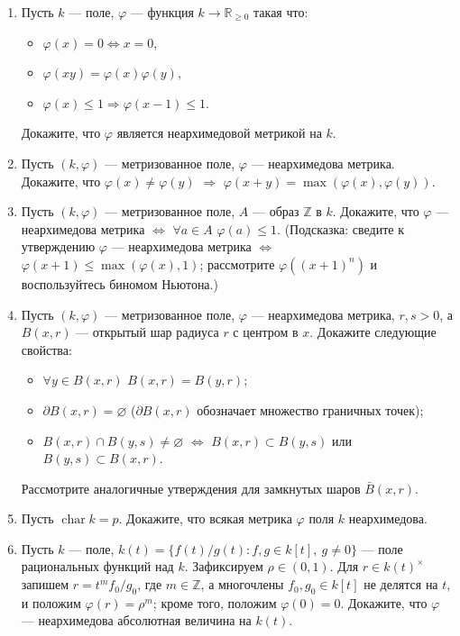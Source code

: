 \documentclass[a4paper, 11pt]{article}
\begin{document}
\begin{enumerate}[topsep=0pt]
    \item Пусть $k$ --- поле, $\varphi$ --- функция $k \rightarrow \mathbb{R}_{\geqslant 0}$ такая что:
    \begin{itemize}[topsep=0pt]
        \item $\varphi(x) = 0 \Leftrightarrow x=0$,
        \item $\varphi(xy) = \varphi(x)\varphi(y)$,
        \item $\varphi(x) \leqslant 1 \Rightarrow \varphi(x-1) \leqslant 1$.
    \end{itemize}
    Докажите, что $\varphi$ является неархимедовой метрикой на $k$.

    \item Пусть $(k,\varphi)$ --- метризованное поле, $\varphi$ --- неархимедова метрика. Докажите, что $\varphi(x) \neq \varphi(y)$ $\Rightarrow$ $\varphi(x+y) = \max(\varphi(x),\varphi(y))$.

    \item Пусть $(k,\varphi)$ --- метризованное поле, $A$ --- образ $\mathbb{Z}$ в $k$. Докажите, что $\varphi$ --- неархимедова метрика $\Leftrightarrow$ $\forall a \in A$ $\varphi(a) \leqslant 1$. (Подсказка: сведите к утверждению $\varphi$ --- неархимедова метрика $\Leftrightarrow$ $\varphi(x+1) \leqslant \max(\varphi(x),1)$; рассмотрите $\varphi((x+1)^n)$ и воспользуйтесь биномом Ньютона.)

    \item Пусть $(k,\varphi)$ --- метризованное поле, $\varphi$ --- неархимедова метрика, $r,s>0$, а $B(x,r)$ --- открытый шар радиуса $r$ с центром в $x$. Докажите следующие свойства:
    \begin{itemize}[topsep=0pt]
        \item $\forall y \in B(x,r)$ $B(x,r)=B(y,r)$;
        \item $\partial B(x,r) = \varnothing$ ($\partial B(x,r)$ обозначает множество граничных точек);
        \item $B(x,r) \cap B(y,s) \neq \varnothing$ $\Leftrightarrow$ $B(x,r) \subset B(y,s)$ или $B(y,s) \subset B(x,r)$.
    \end{itemize}
    Рассмотрите аналогичные утверждения для замкнутых шаров $\bar B(x,r)$.

    \item Пусть $\operatorname{char} k = p$. Докажите, что всякая метрика $\varphi$ поля $k$ неархимедова.

    \item Пусть $k$ --- поле, $k(t)=\{f(t)/g(t): f,g\in k[t],\ g\neq 0\}$ --- поле рациональных функций над $k$. Зафиксируем $\rho\in(0,1)$. Для $r\in k(t)^\times$ запишем $r=t^m f_0/g_0$, где $m\in\mathbb Z$, а многочлены $f_0,g_0\in k[t]$ не делятся на $t$, и положим $\varphi(r)=\rho^m$; кроме того, положим $\varphi(0)=0$. Докажите, что $\varphi$ --- неархимедова абсолютная величина на $k(t)$.

\end{enumerate}
\end{document}
